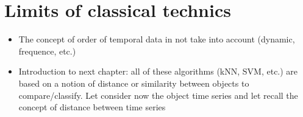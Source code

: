 \section{Limits of classical technics}
\begin{itemize}
	\item The concept of order of temporal data in not take into account (dynamic, frequence, etc.)
	\item Introduction to next chapter: all of these algorithms (kNN, SVM, etc.) are based on a notion of distance or similarity between objects to compare/classify. Let consider now the object time series and let recall the concept of distance between time series
\end{itemize}


